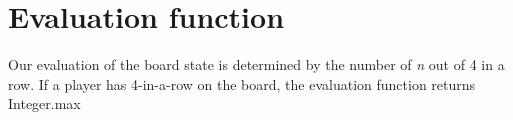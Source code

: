 \section{Evaluation function}
Our evaluation of the board state is determined by the number of \textit{n} out of 4 in a row. If a player has 4-in-a-row on the board, the evaluation function returns Integer.max 